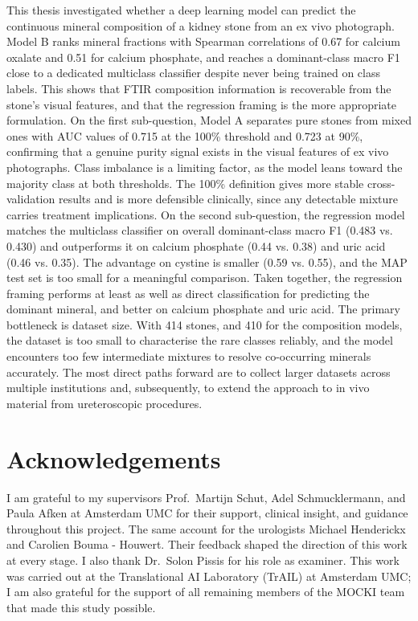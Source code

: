 \documentclass[10pt,twocolumn]{article}
\begin{document}
This thesis investigated whether a deep learning model can predict the continuous mineral composition of a kidney stone from an ex vivo photograph. Model B ranks mineral fractions with Spearman correlations of 0.67 for calcium oxalate and 0.51 for calcium phosphate, and reaches a dominant-class macro F1 close to a dedicated multiclass classifier despite never being trained on class labels. This shows that FTIR composition information is recoverable from the stone's visual features, and that the regression framing is the more appropriate formulation.
On the first sub-question, Model A separates pure stones from mixed ones with AUC values of 0.715 at the 100\% threshold and 0.723 at 90\%, confirming that a genuine purity signal exists in the visual features of ex vivo photographs. Class imbalance is a limiting factor, as the model leans toward the majority class at both thresholds. The 100\% definition gives more stable cross-validation results and is more defensible clinically, since any detectable mixture carries treatment implications.
On the second sub-question, the regression model matches the multiclass classifier on overall dominant-class macro F1 (0.483 vs. 0.430) and outperforms it on calcium phosphate (0.44 vs. 0.38) and uric acid (0.46 vs. 0.35). The advantage on cystine is smaller (0.59 vs. 0.55), and the MAP test set is too small for a meaningful comparison. Taken together, the regression framing performs at least as well as direct classification for predicting the dominant mineral, and better on calcium phosphate and uric acid.
The primary bottleneck is dataset size. With 414 stones, and 410 for the composition models, the dataset is too small to characterise the rare classes reliably, and the model encounters too few intermediate mixtures to resolve co-occurring minerals accurately. The most direct paths forward are to collect larger datasets across multiple institutions and, subsequently, to extend the approach to in vivo material from ureteroscopic procedures.

\section*{Acknowledgements}

I am grateful to my supervisors Prof.\ Martijn Schut, Adel Schmucklermann, and Paula Afken at Amsterdam UMC for their support, clinical insight, and guidance throughout this project. The same account for the urologists Michael Henderickx and Carolien Bouma - Houwert. Their feedback shaped the direction of this work at every stage. I also thank Dr.\ Solon Pissis for his role as examiner. This work was carried out at the Translational AI Laboratory (TrAIL) at Amsterdam UMC; I am also grateful for the support of all remaining members of the MOCKI team that made this study possible. 
\end{document}
